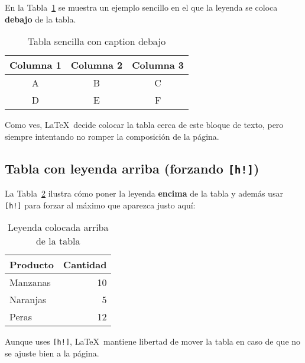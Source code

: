 \documentclass[12pt]{article}
\begin{document}
En la Tabla~\ref{tab:simple} se muestra un ejemplo sencillo en el que la 
leyenda se coloca \textbf{debajo} de la tabla.

\begin{table}[ht]
    \centering
    \begin{tabular}{c|c|c}
    \hline
    \textbf{Columna 1} & \textbf{Columna 2} & \textbf{Columna 3} \\
    \hline
    A & B & C \\
    D & E & F \\
    \hline
    \end{tabular}
    \caption{Tabla sencilla con caption debajo}
    \label{tab:simple}
\end{table}

Como ves, \LaTeX\ decide colocar la tabla cerca de este bloque de texto,
pero siempre intentando no romper la composición de la página.

\subsection{Tabla con leyenda arriba (forzando \texttt{[h!]})}

La Tabla~\ref{tab:arriba} ilustra cómo poner la leyenda \textbf{encima} 
de la tabla y además usar \texttt{[h!]} para forzar al máximo que aparezca 
justo aquí:

\begin{table}[h!]
    \caption{Leyenda colocada arriba de la tabla}
    \label{tab:arriba}
    \centering
    \begin{tabular}{l r}
        \toprule
        \textbf{Producto} & \textbf{Cantidad} \\
        \midrule
        Manzanas & 10 \\
        Naranjas & 5 \\
        Peras & 12 \\
        \bottomrule
    \end{tabular}
\end{table}

Aunque uses \texttt{[h!]}, \LaTeX\ mantiene libertad de mover la tabla
en caso de que no se ajuste bien a la página.

\printbibliography
\end{document}
